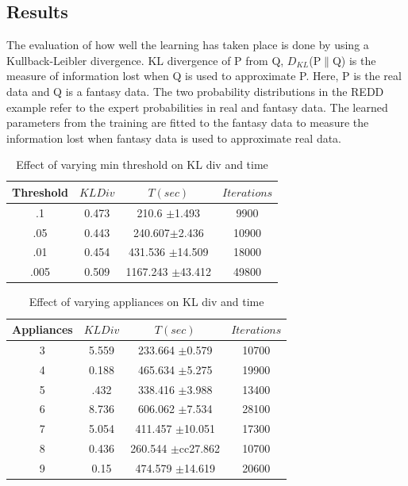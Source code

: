 \documentclass{sig-alternate}
\begin{document}
\subsection{Results}
The evaluation of how well the learning has taken place is done by using a Kullback-Leibler divergence. KL divergence of P from Q, $D_{KL}$(P$\parallel$Q) is the measure of information lost when Q is used to approximate P. Here, P is the real data and Q is a fantasy data. The two probability distributions in the REDD example refer to the expert probabilities in real and fantasy data. The learned parameters from the training are fitted to the fantasy data to measure the information lost when fantasy data is used to approximate real data.
\begin{table}[htdp]
\begin{center}
\begin{tabular}{| c | c | c | c |}
\hline
Threshold & $KL Div$ & $T(sec)$ & $Iterations$ \\
\hline
.1 & 0.473 & 210.6 $\pm$1.493 & 9900 \\
.05 & 0.443 & 240.607$\pm$2.436 & 10900 \\
.01 & 0.454 & 431.536 $\pm$14.509 & 18000 \\
.005 & 0.509 & 1167.243 $\pm$43.412 & 49800 \\
\hline
\end{tabular}
\end{center}
\caption{Effect of varying min threshold on KL div and time}
\label{table: error3}
\end{table}

\begin{table}[htdp]
\begin{center}
\begin{tabular}{| c | c | c | c |}
\hline
Appliances & $KL Div$ & $T(sec)$ & $Iterations$ \\
\hline
3 & 5.559 & 233.664 $\pm$0.579 & 10700 \\
4 & 0.188 & 465.634 $\pm$5.275 & 19900 \\
5 & .432 & 338.416 $\pm$3.988  & 13400 \\
6 & 8.736 & 606.062 $\pm$7.534 & 28100 \\
7 & 5.054 & 411.457 $\pm$10.051 & 17300 \\
8 & 0.436 & 260.544 $\pm$cc27.862 & 10700 \\
9 & 0.15 & 474.579 $\pm$14.619 & 20600 \\
\hline
\end{tabular}
\end{center}
\caption{Effect of varying appliances on KL div and time}
\label{table: error4}
\end{table}
\end{document}
